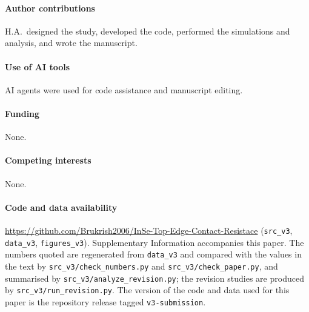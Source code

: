 \documentclass[11pt]{article}
\begin{document}
\paragraph{Author contributions} H.A.\ designed the study, developed the code, performed the simulations and analysis, and wrote the manuscript.
\paragraph{Use of AI tools} AI agents were used for code assistance and manuscript editing.
\paragraph{Funding} None. \paragraph{Competing interests} None.
\paragraph{Code and data availability} \url{https://github.com/Brukrish2006/InSe-Top-Edge-Contact-Resistace} (\texttt{src\_v3}, \texttt{data\_v3}, \texttt{figures\_v3}). Supplementary Information accompanies this paper. The numbers quoted are regenerated from \texttt{data\_v3} and compared with the values in the text by \texttt{src\_v3/check\_numbers.py} and \texttt{src\_v3/check\_paper.py}, and summarised by \texttt{src\_v3/analyze\_revision.py}; the revision studies are produced by \texttt{src\_v3/run\_revision.py}. The version of the code and data used for this paper is the repository release tagged \texttt{v3-submission}.
\end{document}
